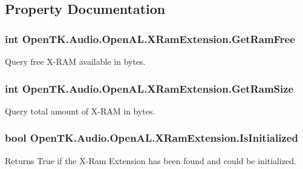 \subsection{Property Documentation}
\hypertarget{class_open_t_k_1_1_audio_1_1_open_a_l_1_1_x_ram_extension_afc089bafb3c8e9e3228d5d9fcb65796e}{
\subsubsection[{Get\-Ram\-Free}]{\setlength{\rightskip}{0pt plus 5cm}int Open\-T\-K.\-Audio.\-Open\-A\-L.\-X\-Ram\-Extension.\-Get\-Ram\-Free\hspace{0.3cm}{\ttfamily [get]}}}\label{class_open_t_k_1_1_audio_1_1_open_a_l_1_1_x_ram_extension_afc089bafb3c8e9e3228d5d9fcb65796e}


Query free X-\/\-R\-A\-M available in bytes.

\hypertarget{class_open_t_k_1_1_audio_1_1_open_a_l_1_1_x_ram_extension_a6e8366ca9f296a39641b08b65844b212}{
\subsubsection[{Get\-Ram\-Size}]{\setlength{\rightskip}{0pt plus 5cm}int Open\-T\-K.\-Audio.\-Open\-A\-L.\-X\-Ram\-Extension.\-Get\-Ram\-Size\hspace{0.3cm}{\ttfamily [get]}}}\label{class_open_t_k_1_1_audio_1_1_open_a_l_1_1_x_ram_extension_a6e8366ca9f296a39641b08b65844b212}


Query total amount of X-\/\-R\-A\-M in bytes.

\hypertarget{class_open_t_k_1_1_audio_1_1_open_a_l_1_1_x_ram_extension_ad20a93cf7373b02fa38cfe469706113c}{
\subsubsection[{Is\-Initialized}]{\setlength{\rightskip}{0pt plus 5cm}bool Open\-T\-K.\-Audio.\-Open\-A\-L.\-X\-Ram\-Extension.\-Is\-Initialized\hspace{0.3cm}{\ttfamily [get]}}}\label{class_open_t_k_1_1_audio_1_1_open_a_l_1_1_x_ram_extension_ad20a93cf7373b02fa38cfe469706113c}


Returns True if the X-\/\-Ram Extension has been found and could be initialized.

